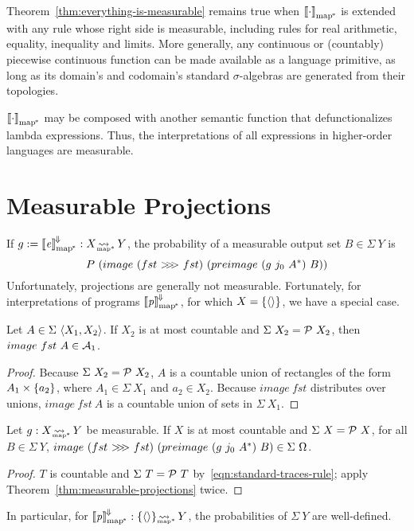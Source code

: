 Theorem~\ref{thm:everything-is-measurable} remains true when $\left\llbracket{\cdot}\right\rrbracket_\mathrm{map^{\mspace{-2mu}*}}$ is extended with any rule whose right side is measurable, including rules for real arithmetic, equality, inequality and limits.
More generally, any continuous or (countably) piecewise continuous function can be made available as a language primitive, as long as its domain's and codomain's standard $\sigma$-algebras are generated from their topologies.

$\left\llbracket{\cdot}\right\rrbracket_\mathrm{map^{\mspace{-2mu}*}}$ may be composed with another semantic function that defunctionalizes lambda expressions.
Thus, the interpretations of all expressions in higher-order languages are measurable.

\section{Measurable Projections}

If $g := \left\llbracket{\mathit{e}}\right\rrbracket^{\mspace{-2mu}\Downarrow\mspace{-2mu}}_\mathrm{map^{\mspace{-2mu}*}} : X \operatorname{\rightsquigarrow_{\mspace{-25mu}_{\mathrm{map*}}}} Y$, the probability of a measurable output set $B \in \Sigma~Y$ is
\begin{equation}
	P~(image~(fst~{>}\mspace{-6mu}{>}\mspace{-6mu}{>}~fst)~(preimage~(g~j_0~A^*)~B))
\end{equation}
Unfortunately, projections are generally not measurable.
Fortunately, for interpretations of programs $\left\llbracket{\mathit{p}}\right\rrbracket^{\mspace{-2mu}\Downarrow\mspace{-2mu}}_\mathrm{map^{\mspace{-2mu}*}}$, for which $X = \{{\langle{}\rangle}\}$, we have a special case.

\begin{theorem}
\label{thm:measurable-projections}
Let $A \in \Sigma~\langle{X_1,X_2}\rangle$.
If $X_2$ is at most countable and $\Sigma~X_2 = \mathcal{P}~X_2$, then $image~fst~A \in \mathcal{A}_1$.%
\end{theorem}
\begin{proof}
Because $\Sigma~X_2 = \mathcal{P}~X_2$, $A$ is a countable union of rectangles of the form $A_1 \times \{{a_2}\}$, where $A_1 \in \Sigma~X_1$ and $a_2 \in X_2$.
Because $image~fst$ distributes over unions, $image~fst~A$ is a countable union of sets in $\Sigma~X_1$.
\end{proof}

\begin{theorem}
Let $g : X \operatorname{\rightsquigarrow_{\mspace{-25mu}_{\mathrm{map*}}}} Y$ be measurable.
If $X$ is at most countable and $\Sigma~X = \mathcal{P}~X$, for all $B \in \Sigma~Y$, $image~(fst~{>}\mspace{-6mu}{>}\mspace{-6mu}{>}~fst)~(preimage~(g~j_0~A^*)~B) \in \Sigma~\Omega$.
\end{theorem}
\begin{proof}
$T$ is countable and $\Sigma~T = \mathcal{P}~T$ by~\eqref{eqn:standard-traces-rule}; apply Theorem~\ref{thm:measurable-projections} twice.
\end{proof}

In particular, for $\left\llbracket{\mathit{p}}\right\rrbracket^{\mspace{-2mu}\Downarrow\mspace{-2mu}}_\mathrm{map^{\mspace{-2mu}*}} : \{{\langle{}\rangle}\} \operatorname{\rightsquigarrow_{\mspace{-25mu}_{\mathrm{map*}}}} Y$, the probabilities of $\Sigma~Y$ are well-defined.

